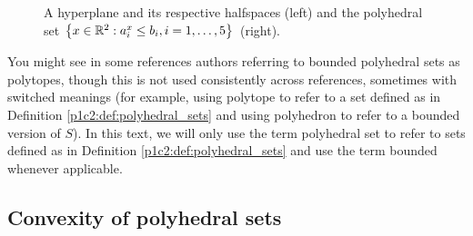 \begin{figure}
			\vspace{1pt}
		\caption{A hyperplane and its respective halfspaces (left) and the polyhedral set $\left\{ x\in \mathbb{R}^{2} : a_i^x \leq b_i, i =1,\dots, 5 \right \}$ (right).} \label{p1c2:fig:hyperplanes_and_polyhedral_set}		
	\end{figure}

You might see in some references authors referring to bounded polyhedral sets as polytopes, though this is not used consistently across references, sometimes with switched meanings (for example, using polytope to refer to a set defined as in Definition \ref{p1c2:def:polyhedral_sets} and using polyhedron to refer to a bounded version of $S$). In this text, we will only use the term polyhedral set to refer to sets defined as in Definition \ref{p1c2:def:polyhedral_sets} and use the term bounded whenever applicable.



\subsection{Convexity of polyhedral sets}

